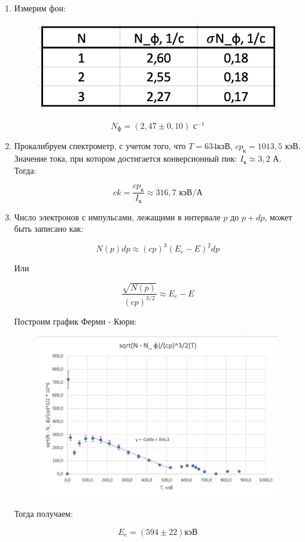 \documentclass[a4paper, 12pt]{article}%
\begin{document}
\begin{enumerate}
	\item Измерим фон:
	
	\begin{figure}[h!]
	    \centering
		\includegraphics[scale=0.7]{Таблица_2.PNG}
	\end{figure}
	
	\[N_\text{ф} = (2,47 \pm 0,10) \text{ с}^{-1}\]

	\item Прокалибруем спектрометр,  с учетом того,  что $T = 634$кэВ,  $cp_\text{к} = 1013, 5$ кэВ.  Значение тока,  при котором достигается конверсионный пик: $I_\text{к} \approx 3,2$ А.  Тогда:
	
	\[ck = \frac{cp_\text{к}}{I_\text{к}} \approx 316,7 \text{ кэВ/А}\]

	\item Число электронов с импульсами,  лежащими в интервале $p$ до $p + dp$,  может быть записано как:
	
	\[N(p) dp \approx (cp)^3 (E_e - E)^2 dp \]

	Или

	\[\frac{\sqrt{N(p)}}{(cp)^{3/2}} \approx E_e - E \]

	Построим график Ферми - Кюри:

	\begin{figure}[h!]
	    \centering
		\includegraphics[scale=0.6]{График_2.PNG}
	\end{figure}

	Тогда получаем:
	
	\[E_e = (594 \pm 22) \text{кэВ}\]

\end{enumerate}
\end{document}
